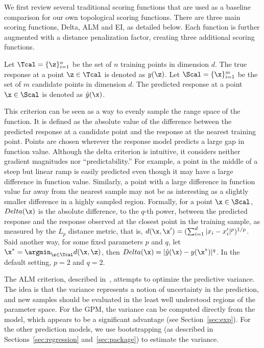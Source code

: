 We first review several traditional scoring functions that are used as a baseline comparison for our own topological scoring functions.
%
There are three main scoring functions, Delta, ALM and EI, as detailed below.
%
Each function is further augmented with a distance penalization factor, creating three additional scoring functions.

Let $\Tcal = \{\z\}_{i=1}^{n}$ be the set of $n$ training points in dimension $d$.
%
The true response at a point $\z \in \Tcal$ is denoted as $y(\z)$.
%
Let $\Scal = \{\x\}_{i=1}^{m}$ be the set of $m$ candidate points in dimension $d$.
%
The predicted response at a point $\x \in \Scal$ is denoted as $\hat{y}(\x)$.

 This criterion can be seen as a way to evenly sample the range space of the function.
%
It is defined as the absolute value of the difference between the predicted response at a candidate point and the response at the nearest training point.
%
Points are chosen wherever the response model predicts a large gap in function value.
%
Although the delta criterion is intuitive, it considers neither gradient magnitudes nor ``predictability.''
%
For example, a point in the middle of a steep but linear ramp is easily predicted even though it may have a large difference in function value.
%
Similarly, a point with a large difference in function value far away from the nearest sample may not be as interesting as a slightly smaller difference in a highly sampled region.
%
Formally, for a point $\x \in \Scal$, $Delta(\x)$ is the absolute difference, to the $q$-th power, between the predicted response and the response observed at the closest point in the training sample, as measured by the $L_p$ distance metric, that is, $d(\x,\x') = (\sum_{i=1}^{d}|x_i-x'_i|^p)^{1/p}$.
%
Said another way, for some fixed parameters $p$ and $q$, let $\x^* = \argmin_{\z \in \Tcal} d(\x,\z)$, then $Delta(\x) = |\hat{y}(\x) - y(\x^*)|^q$.
%
In the default setting, $p = 2$ and $q = 2$.

 The ALM criterion, described in~\cite{MacKay1992}, attempts to optimize the predictive variance.
%
The idea is that the variance represents a notion of uncertainty in the prediction, and new samples should be evaluated in the least well understood regions of the parameter space.
%
For the GPM, the variance can be computed directly from the model, which appears to be a significant advantage (see Section~\ref{sec:exp}).
%
For the other prediction models, we use bootstrapping (as described in Sections~\ref{sec:regression} and~\ref{sec:package}) to estimate the variance.

